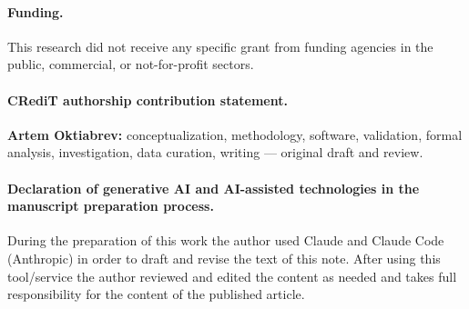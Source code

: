 \paragraph{Funding.}
This research did not receive any specific grant from funding agencies in the public, commercial,
or not-for-profit sectors.

\paragraph{CRediT authorship contribution statement.}
\textbf{Artem Oktiabrev:} conceptualization, methodology, software, validation, formal analysis,
investigation, data curation, writing --- original draft and review.

\paragraph{Declaration of generative AI and AI-assisted technologies in the manuscript
preparation process.}
During the preparation of this work the author used Claude and Claude Code (Anthropic) in order
to draft and revise the text of this note. After using this tool/service the author reviewed
and edited the content as needed and takes full responsibility for the content of the published
article.
